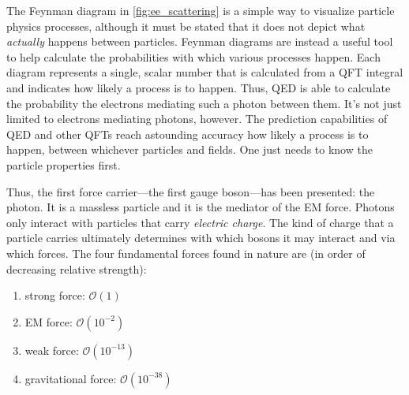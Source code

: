 The Feynman diagram in \cref{fig:ee_scattering} is a simple way to visualize particle physics processes, although it must be stated that it does not depict what \emph{actually} happens between particles.
Feynman diagrams are instead a useful tool to help calculate the probabilities with which various processes happen.
Each diagram represents a single, scalar number that is calculated from a QFT integral and indicates how likely a process is to happen.
Thus, QED is able to calculate the probability the electrons mediating such a photon between them. 
It's not just limited to electrons mediating photons, however.
The prediction capabilities of QED and other QFTs reach astounding accuracy how likely a process is to happen, between whichever particles and fields. 
One just needs to know the particle properties first.

Thus, the first force carrier---the first gauge boson---has been presented: the photon.
It is a massless particle and it is the mediator of the EM force. 
Photons only interact with particles that carry \emph{electric charge}.
The kind of charge that a particle carries ultimately determines with which bosons it may interact and via which forces.
The four fundamental forces found in nature are (in order of decreasing relative strength):
\begin{enumerate}
    \item strong force: $\mathcal{O}(1)$
    \item EM force: $\mathcal{O}(10^{-2})$
    \item weak force: $\mathcal{O}(10^{-13})$
    \item gravitational force: $\mathcal{O}(10^{-38})$
\end{enumerate}

